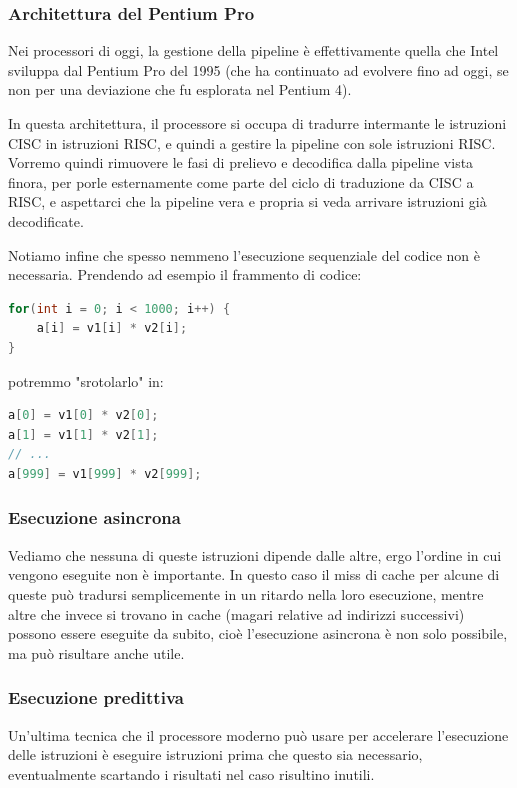 \documentclass[a4paper,11pt]{article}
\begin{document}
\begin{itemize}
\begin{itemize}
		\end{itemize}

\end{itemize}

\subsubsection{Architettura del Pentium Pro}
Nei processori di oggi, la gestione della pipeline è effettivamente quella che Intel sviluppa dal Pentium Pro del 1995 (che ha continuato ad evolvere fino ad oggi, se non per una deviazione che fu esplorata nel Pentium 4).

In questa architettura, il processore si occupa di tradurre intermante le istruzioni CISC in istruzioni RISC, e quindi a gestire la pipeline con sole istruzioni RISC.
Vorremo quindi rimuovere le fasi di prelievo e decodifica dalla pipeline vista finora, per porle esternamente come parte del ciclo di traduzione da CISC a RISC, e aspettarci che la pipeline vera e propria si veda arrivare istruzioni già decodificate. 

\par\medskip

Notiamo infine che spesso nemmeno l'esecuzione sequenziale del codice non è necessaria.
Prendendo ad esempio il frammento di codice:
\begin{lstlisting}[language=C++, style=codestyle]	
for(int i = 0; i < 1000; i++) {
	a[i] = v1[i] * v2[i];
}
\end{lstlisting}
potremmo "srotolarlo" in:
\begin{lstlisting}[language=C++, style=codestyle]	
a[0] = v1[0] * v2[0];
a[1] = v1[1] * v2[1];
// ...
a[999] = v1[999] * v2[999];
\end{lstlisting}

\subsubsection{Esecuzione asincrona}
Vediamo che nessuna di queste istruzioni dipende dalle altre, ergo l'ordine in cui vengono eseguite non è importante.
In questo caso il miss di cache per alcune di queste può tradursi semplicemente in un ritardo nella loro esecuzione, mentre altre che invece si trovano in cache (magari relative ad indirizzi successivi) possono essere eseguite da subito, cioè l'esecuzione asincrona è non solo possibile, ma può risultare anche utile.

\subsubsection{Esecuzione predittiva}
Un'ultima tecnica che il processore moderno può usare per accelerare l'esecuzione delle istruzioni è eseguire istruzioni prima che questo sia necessario, eventualmente scartando i risultati nel caso risultino inutili. 
\end{document}
